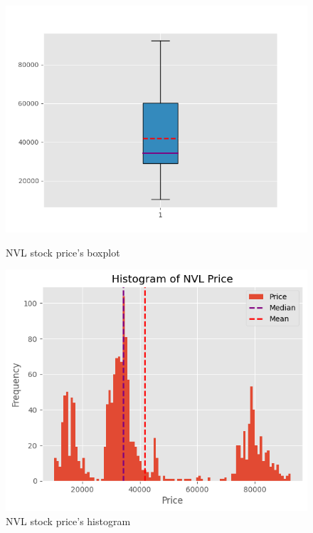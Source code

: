 \documentclass[conference]{IEEEtran}
\begin{document}
\begin{figure}[htbp]
\centering
    \begin{minipage}{0.23\textwidth}
    \centering
    \includegraphics[width=1\textwidth]{Boxplot_NVL.png}
    \caption{NVL stock price's boxplot}
    \label{fig:nvl_boxplot}
    \end{minipage}
    \hfill
    \begin{minipage}{0.23\textwidth}
    \centering
    \includegraphics[width=1\textwidth]{Histogram NVL.png}
    \caption{NVL stock price's histogram}
    \label{fig:nvl_histogram}
    \end{minipage}


\end{figure}
\end{document}
